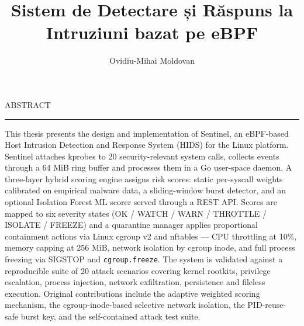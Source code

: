 \documentclass[12pt]{report}
\begin{document}
\title{Sistem de Detectare și Răspuns la Intruziuni bazat pe eBPF}
\author{Ovidiu-Mihai Moldovan}
				
\maketitle


\newpage
\thispagestyle{empty}
\mbox{}
\newpage
{} 

\cleardoublepage
ABSTRACT
\vspace{0.5cm}	
\hrule
\vspace{0.5cm}	

This thesis presents the design and implementation of Sentinel, an eBPF-based Host Intrusion Detection and Response System (HIDS) for the Linux platform. Sentinel attaches kprobes to 20 security-relevant system calls, collects events through a 64 MiB ring buffer and processes them in a Go user-space daemon. A three-layer hybrid scoring engine assigns risk scores: static per-syscall weights calibrated on empirical malware data, a sliding-window burst detector, and an optional Isolation Forest ML scorer served through a REST API. Scores are mapped to six severity states (OK / WATCH / WARN / THROTTLE / ISOLATE / FREEZE) and a quarantine manager applies proportional containment actions via Linux cgroup v2 and nftables --- CPU throttling at 10\%, memory capping at 256 MiB, network isolation by cgroup inode, and full process freezing via SIGSTOP and \texttt{cgroup.freeze}. The system is validated against a reproducible suite of 20 attack scenarios covering kernel rootkits, privilege escalation, process injection, network exfiltration, persistence and fileless execution. Original contributions include the adaptive weighted scoring mechanism, the cgroup-inode-based selective network isolation, the PID-reuse-safe burst key, and the self-contained attack test suite.



\tableofcontents


\newpage
{}










\end{document}
